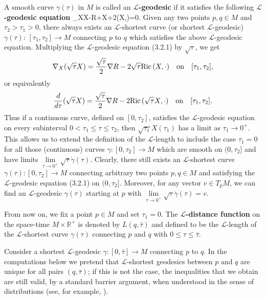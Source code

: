 A smooth curve $\gamma(\tau)$ in $M$ is called an {\bf
$\mathcal{L}$-geodesic}
if it satisfies the following {\bf $\mathcal{L}$-geodesic
equation} \be
\nabla_XX-\nabla R+X+2\Ric(X,\cdot)=0.
\ee Given any two points $p,q\in M$ and $\tau_2>\tau_1>0$, there
always exists an $\mathcal{L}$-shortest curve (or shortest
$\mathcal{L}$-geodesic) $\gamma(\tau)$:
$[\tau_1,\tau_2]\rightarrow M$ connecting $p$ to $q$ which
satisfies the above $\mathcal{L}$-geodesic equation. Multiplying
the $\mathcal{L}$-geodesic equation (3.2.1) by $\sqrt{\tau}$, we
get
$$
\nabla_X(\sqrt{\tau}X)=\frac{\sqrt{\tau}}{2}\nabla R
-2\sqrt{\tau}{\rm Ric}\,(X,\cdot)\quad \text{on}\quad [\tau_1,\tau_2],
$$
or equivalently
$$
\frac{d}{d\tau}(\sqrt{\tau}X)=\frac{\sqrt{\tau}}{2}\nabla R
-2{\rm Ric}\,(\sqrt{\tau}X,\cdot) \quad \text{on}\quad [\tau_1,\tau_2].
$$
Thus if a continuous curve, defined on $[0,\tau_2]$, satisfies the
$\mathcal{L}$-geodesic equation on every subinterval
$0<\tau_1\le\tau\le\tau_2$, then $\sqrt{\tau_1}X(\tau_1)$ has a
limit as $\tau_1\rightarrow 0^+$. This allows us to extend the
definition of the $\mathcal{L}$-length to include the case
$\tau_1=0$ for all those (continuous) curves $\gamma:
[0,\tau_2]\rightarrow M$ which are smooth on $(0,\tau_2]$ and have
limits
$\lim\limits_{\tau\rightarrow0^+}\sqrt{\tau}\dot{\gamma}(\tau)$.
Clearly, there still exists an $\mathcal{L}$-shortest curve
$\gamma(\tau):[0,\tau_2]\rightarrow M$ connecting arbitrary two
points $p,q\in M$ and satisfying the $\mathcal{L}$-geodesic
equation (3.2.1) on $(0,\tau_2]$. Moreover, for any vector $v \in
T_pM$, we can find an $\mathcal{L}$-geodesic $\gamma(\tau)$
starting at $p$ with
$\lim\limits_{\tau\rightarrow0^+}\sqrt{\tau}\dot{\gamma}(\tau)=v$.

{}From now on, we fix a point $p\in M$ and set $\tau_1=0$. The
{\bf $\mathcal{L}$-distance function} on the space-time $M\times \mathbb{R}^+$ is denoted by
$L(q,\bar{\tau})$ and defined to be the $\mathcal{L}$-length of
the $\mathcal{L}$-shortest curve $\gamma(\tau)$ connecting $p$ and
$q$ with $0\le\tau\le\bar{\tau}$.

Consider a shortest $\mathcal{L}$-geodesic $\gamma: [0,\bar \tau]
\rightarrow M$ connecting $p$ to $q$. In the computations below we
pretend that $\mathcal{L}$-shortest geodesics between $p$ and $q$
are unique for all pairs $(q,\bar \tau)$; if this is not the case,
the inequalities that we obtain are still valid, by a standard
barrier argument, when understood in the sense of distributions
(see, for example, \cite{ScY}).

